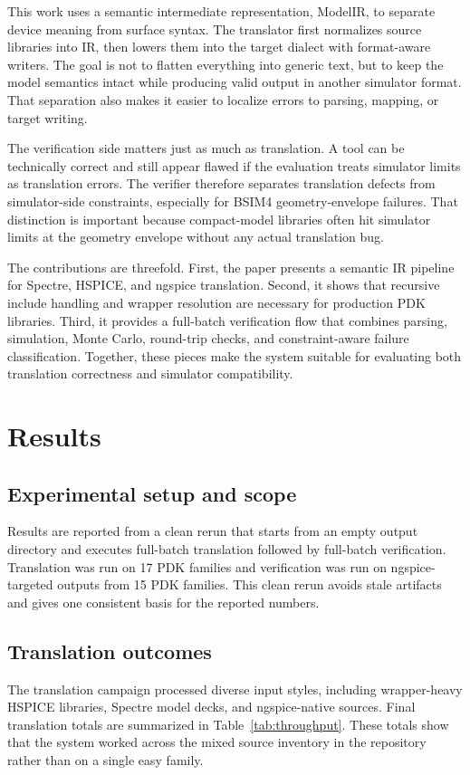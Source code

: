 \documentclass[10pt,twocolumn]{article}
\begin{document}
This work uses a semantic intermediate representation, ModelIR, to separate device meaning from surface syntax. The translator first normalizes source libraries into IR, then lowers them into the target dialect with format-aware writers. The goal is not to flatten everything into generic text, but to keep the model semantics intact while producing valid output in another simulator format. That separation also makes it easier to localize errors to parsing, mapping, or target writing.

The verification side matters just as much as translation. A tool can be technically correct and still appear flawed if the evaluation treats simulator limits as translation errors. The verifier therefore separates translation defects from simulator-side constraints, especially for BSIM4 geometry-envelope failures. That distinction is important because compact-model libraries often hit simulator limits at the geometry envelope without any actual translation bug.

The contributions are threefold. First, the paper presents a semantic IR pipeline for Spectre, HSPICE, and ngspice translation. Second, it shows that recursive include handling and wrapper resolution are necessary for production PDK libraries. Third, it provides a full-batch verification flow that combines parsing, simulation, Monte Carlo, round-trip checks, and constraint-aware failure classification. Together, these pieces make the system suitable for evaluating both translation correctness and simulator compatibility.

\section{Results}

\subsection{Experimental setup and scope}
Results are reported from a clean rerun that starts from an empty output directory and executes full-batch translation followed by full-batch verification. Translation was run on 17 PDK families and verification was run on ngspice-targeted outputs from 15 PDK families. This clean rerun avoids stale artifacts and gives one consistent basis for the reported numbers.

\subsection{Translation outcomes}
The translation campaign processed diverse input styles, including wrapper-heavy HSPICE libraries, Spectre model decks, and ngspice-native sources. Final translation totals are summarized in Table~\ref{tab:throughput}. These totals show that the system worked across the mixed source inventory in the repository rather than on a single easy family.
\end{document}

